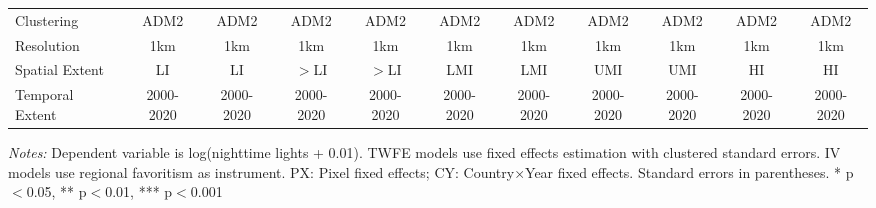 \begin{table}[htbp]
\begin{tabular}{lcccccccccc}
Clustering & ADM2 & ADM2 & ADM2 & ADM2 & ADM2 & ADM2 & ADM2 & ADM2 & ADM2 & ADM2 \\
Resolution & 1km & 1km & 1km & 1km & 1km & 1km & 1km & 1km & 1km & 1km \\
Spatial Extent & LI & LI & $>$LI & $>$LI & LMI & LMI & UMI & UMI & HI & HI \\
Temporal Extent & 2000-2020 & 2000-2020 & 2000-2020 & 2000-2020 & 2000-2020 & 2000-2020 & 2000-2020 & 2000-2020 & 2000-2020 & 2000-2020 \\
\bottomrule
\end{tabular}
\begin{threeparttable}
\begin{tablenotes}\small
\item \textit{Notes:} Dependent variable is log(nighttime lights + 0.01). TWFE models use  fixed effects estimation with clustered standard errors. IV models use regional favoritism as instrument. PX: Pixel fixed effects; CY: Country×Year fixed effects. Standard errors in parentheses. * p$<$0.05, ** p$<$0.01, *** p$<$0.001
\end{tablenotes}
\end{threeparttable}
\end{table}